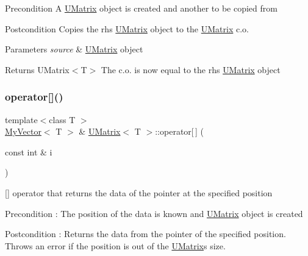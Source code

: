 \begin{DoxyPrecond}{Precondition}
A \mbox{\hyperlink{class_u_matrix}{U\+Matrix}} object is created and another to be copied from 
\end{DoxyPrecond}
\begin{DoxyPostcond}{Postcondition}
Copies the rhs \mbox{\hyperlink{class_u_matrix}{U\+Matrix}} object to the \mbox{\hyperlink{class_u_matrix}{U\+Matrix}} c.\+o. 
\end{DoxyPostcond}

\begin{DoxyParams}{Parameters}
{\em source} & \mbox{\hyperlink{class_u_matrix}{U\+Matrix}} object \\
\hline
\end{DoxyParams}
\begin{DoxyReturn}{Returns}
U\+Matrix$<$\+T$>$ The c.\+o. is now equal to the rhs \mbox{\hyperlink{class_u_matrix}{U\+Matrix}} object 
\end{DoxyReturn}
\mbox{\label{class_u_matrix_a0dea1e82fbf5ae67bec479c070b185dc}} 
\subsubsection{\texorpdfstring{operator[]()}{operator[]()}\hspace{0.1cm}{\footnotesize\ttfamily [1/2]}}
{\footnotesize\ttfamily template$<$class T $>$ \\
\mbox{\hyperlink{class_my_vector}{My\+Vector}}$<$ T $>$ \& \mbox{\hyperlink{class_u_matrix}{U\+Matrix}}$<$ T $>$\+::operator\mbox{[}$\,$\mbox{]} (\begin{DoxyParamCaption}\item[{const int \&}]{i }\end{DoxyParamCaption})}



\mbox{[}\mbox{]} operator that returns the data of the pointer at the specified position 

\begin{DoxyPrecond}{Precondition}
\+: The position of the data is known and \mbox{\hyperlink{class_u_matrix}{U\+Matrix}} object is created 
\end{DoxyPrecond}
\begin{DoxyPostcond}{Postcondition}
\+: Returns the data from the pointer of the specified position. Throws an error if the position is out of the \mbox{\hyperlink{class_u_matrix}{U\+Matrix}}\textquotesingle{}s size. 
\end{DoxyPostcond}

